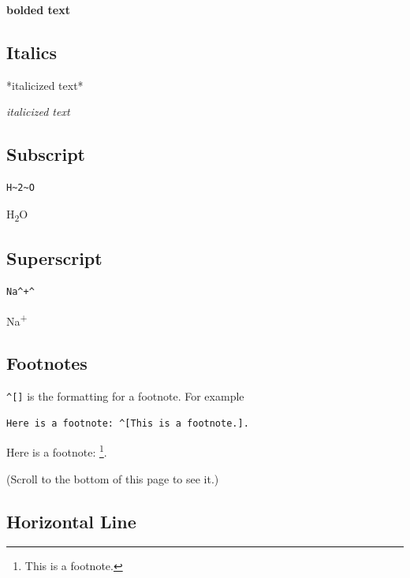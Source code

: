 \documentclass[
]{book}
\newenvironment{Shaded}{\begin{snugshade}}{\end{snugshade}}
\newcommand{\NormalTok}[1]{#1}
\theoremstyle{definition}
\theoremstyle{definition}
\theoremstyle{definition}
\theoremstyle{definition}
\theoremstyle{remark}
\begin{document}
\textbf{bolded text}

\subsection*{Italics}\label{italics}

\begin{Shaded}
\begin{Highlighting}[]
\NormalTok{*italicized text*}
\end{Highlighting}
\end{Shaded}

\emph{italicized text}

\subsection*{Subscript}\label{subscript}

\begin{verbatim}
H~2~O
\end{verbatim}

H\textsubscript{2}O

\subsection*{Superscript}\label{superscript}

\begin{verbatim}
Na^+^
\end{verbatim}

Na\textsuperscript{+}

\subsection*{Footnotes}\label{footnotes}

\texttt{\^{}{[}{]}} is the formatting for a footnote. For example

\begin{verbatim}
Here is a footnote: ^[This is a footnote.].
\end{verbatim}

Here is a footnote: \footnote{This is a footnote.}.

(Scroll to the bottom of this page to see it.)

\subsection*{Horizontal Line}\label{horizontal-line}
\end{document}
